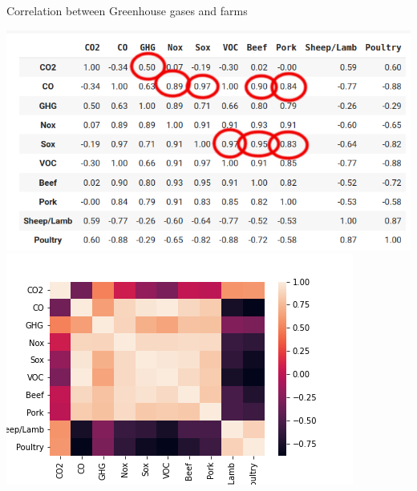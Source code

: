 \documentclass[t,9pt,aspectratio=169]{beamer}
\begin{document}
\begin{frame}{Correlation between Greenhouse gases and farms}
\begin{center}
\includegraphics[scale=0.3 ]{./figures/corr_ma_num} \includegraphics[scale=0.3]{./figures/matrix_1} 
\end{center}
\end{frame} 
\end{document}
